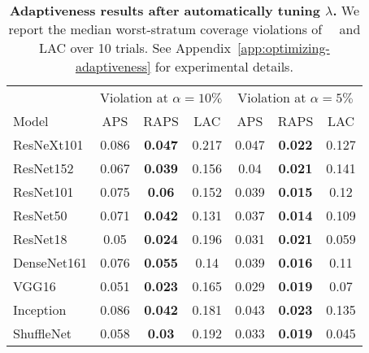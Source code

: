 \begin{table}[t]
\centering
\small
\begin{tabular}{lcccccc}
\toprule 
 & \multicolumn{3}{c}{Violation at $\alpha=10\%$}  & \multicolumn{3}{c}{Violation at $\alpha=5\%$} \\ 
\cmidrule(r){2-4}  \cmidrule(r){5-7} 
Model & APS & RAPS & LAC & APS & RAPS & LAC \\ 
\midrule 
ResNeXt101 & 0.086 & \bf 0.047 & 0.217 & 0.047 & \bf 0.022 & 0.127 \\ 
ResNet152 & 0.067 & \bf 0.039 & 0.156 & 0.04 & \bf 0.021 & 0.141 \\ 
ResNet101 & 0.075 & \bf 0.06 & 0.152 & 0.039 & \bf 0.015 & 0.12 \\ 
ResNet50 & 0.071 & \bf 0.042 & 0.131 & 0.037 & \bf 0.014 & 0.109 \\ 
ResNet18 & 0.05 & \bf 0.024 & 0.196 & 0.031 & \bf 0.021 & 0.059 \\ 
DenseNet161 & 0.076 & \bf 0.055 & 0.14 & 0.039 & \bf 0.016 & 0.11 \\ 
VGG16 & 0.051 & \bf 0.023 & 0.165 & 0.029 & \bf 0.019 & 0.07 \\ 
Inception & 0.086 & \bf 0.042 & 0.181 & 0.043 & \bf 0.023 & 0.135 \\ 
ShuffleNet & 0.058 & \bf 0.03 & 0.192 & 0.033 & \bf 0.019 & 0.045 \\ 
\bottomrule 
\end{tabular} 
\caption{\textbf{Adaptiveness results after automatically tuning $\lambda$.} We report the median worst-stratum coverage violations of \aps\, \raps\, and LAC over 10 trials. See Appendix~\ref{app:optimizing-adaptiveness} for experimental details.} 
\label{table:LAC-tunelambda} 
\end{table} 
